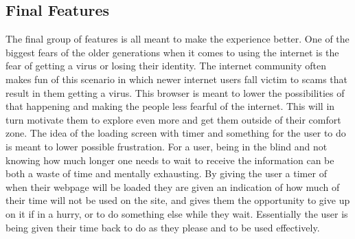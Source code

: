 \documentclass[11pt]{article}
\begin{document}
\subsection{Final Features}
The final group of features is all meant to make the experience better. One of the biggest fears of the older generations when it comes to using the internet is the fear of getting a virus or losing their identity. The internet community often makes fun of this scenario in which newer internet users fall victim to scams that result in them getting a virus. This browser is meant to lower the possibilities of that happening and making the people less fearful of the internet. This will in turn motivate them to explore even more and get them outside of their comfort zone. The idea of the loading screen with timer and something for the user to do is meant to lower possible frustration. For a user, being in the blind and not knowing how much longer one needs to wait to receive the information can be both a waste of time and mentally exhausting. By giving the user a timer of when their webpage will be loaded they are given an indication of how much of their time will not be used on the site, and gives them the opportunity to give up on it if in a hurry, or to do something else while they wait. Essentially the user is being given their time back to do as they please and to be used effectively.
%
\end{document}
